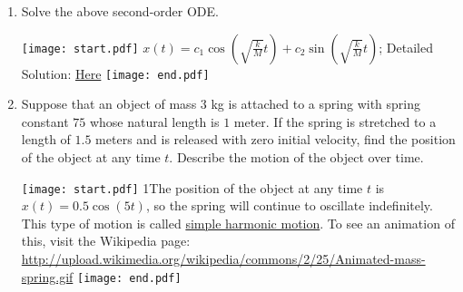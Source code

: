 \documentclass[12pt]{article}
\begin{document}
\begin{enumerate}
\begin{enumerate}

\item Solve the above second-order ODE.

\texttt{[image: start.pdf]}
{{$x(t)=c_1\cos{\left(\sqrt{\frac{k}{M}}t\right)}+c_2\sin{\left(\sqrt{\frac{k}{M}}t\right)}$; Detailed Solution: \textcolor{blue}{\href{http://www.math.drexel.edu/classes/Calculus/resources/Math123HW/Solutions/123_04_Second_Order_ODEs_15.pdf}{Here}}}}
\texttt{[image: end.pdf]}


\item Suppose that an object of mass $3$ kg is attached to a spring with spring constant $75$ whose natural length is $1$ meter.  If the spring is stretched to a length of $1.5$ meters and is released with zero initial velocity, find the position of the object at any time $t$.  Describe the motion of the object over time.

\texttt{[image: start.pdf]}
{{{1\linewidth}{The position of the object at any time $t$ is $x(t)=0.5\cos{\left(5t\right)}$, so the spring will continue to oscillate indefinitely.  This type of motion
is called \underline{simple harmonic motion}.  To see an animation of this, visit the Wikipedia page: \\ \url{http://upload.wikimedia.org/wikipedia/commons/2/25/Animated-mass-spring.gif}
 }}}
\texttt{[image: end.pdf]}
   

 \end{enumerate}

\end{enumerate}
\end{document}
